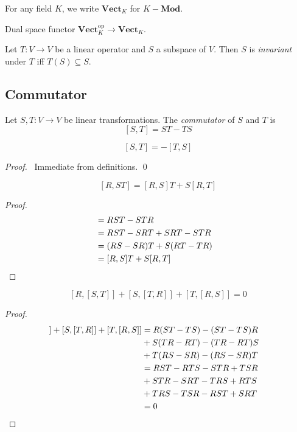 \begin{df}
For any field $K$, we write $\mathbf{Vect}_K$ for $K-\mathbf{Mod}$.
\end{df}

Dual space functor $\mathbf{Vect}_K^{\mathrm{op}} \rightarrow \mathbf{Vect}_K$.

\begin{df}[Invariant]
Let $T : V \rightarrow V$ be a linear operator and $S$ a subspace of $V$. Then $S$ is \emph{invariant} under $T$ iff $T(S) \subseteq S$.
\end{df}

\subsection{Commutator}

\begin{df}[Commutator]
Let $S,T : V \rightarrow V$ be linear transformations. The \emph{commutator} of $S$ and $T$ is
\[ [S,T] = ST - TS \]
\end{df}

\begin{prop}
\[ [S,T] = -[T,S] \]
\end{prop}

\begin{proof}
\pf\ Immediate from definitions. \qed
\end{proof}

\begin{prop}
\[ [R,ST] = [R,S]T + S[R,T] \]
\end{prop}

\begin{proof}
\pf
\begin{align*}
[R,ST] & = RST - STR \\
& = RST - SRT + SRT - STR \\
& = (RS - SR) T + S(RT - TR) \\
& = [R,S]T + S[R,T] & \qed
\end{align*}
\end{proof}

\begin{prop}
\[ [R, [S,T]] + [S,[T,R]] + [T,[R,S]] = 0 \]
\end{prop}

\begin{proof}
\pf
\begin{align*}
[R,[S,T]] + [S,[T,R]] + [T,[R,S]]
& = R(ST-TS) - (ST-TS)R \\
& + S(TR - RT) - (TR - RT)S \\
& + T(RS - SR) - (RS - SR)T \\
& = RST - RTS - STR + TSR \\
& + STR - SRT - TRS + RTS \\
& + TRS - TSR - RST + SRT \\
& = 0 & \qed
\end{align*}
\end{proof}

